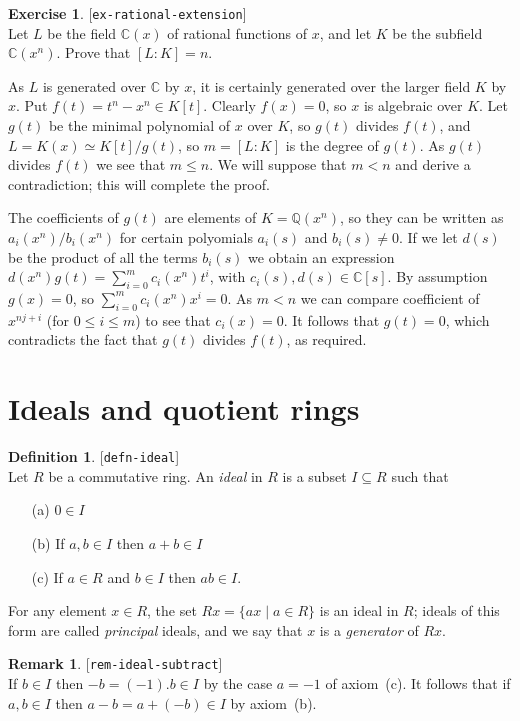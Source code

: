 \documentclass{amsart}
\newcommand{\lbl}[1]{\label{#1}\textup{[\texttt{#1}]}\ \\}
\newcommand{\lbl}{\label}
\newcommand{\Q}         {{\mathbb{Q}}}
\newcommand{\C}         {{\mathbb{C}}}
\newcommand{\st}        {\;|\;}
\newcommand{\sse}       {\subseteq}
\renewcommand{\:}{\colon}
\newcommand{\lastexlabel}{}
\newcommand{\exlabel}[1]{
 \global\def\lastexlabel{#1}\label{#1}[\texttt{#1}]\ \\
}
\newcommand{\exlabel}[1]{
 \global\def\lastexlabel{#1}\label{#1}
}
\newenvironment{solution}{\SolutionInline}{\endSolutionInline}
\theoremstyle{definition}
\newtheorem{remark}[theorem]{Remark}
\newtheorem{definition}[theorem]{Definition}
\newtheorem{exercise}{Exercise}[section]
\renewenvironment{solution}{\SolutionAtEnd}{\endSolutionAtEnd}
\begin{document}
\begin{exercise}\exlabel{ex-rational-extension}
 Let $L$ be the field $\C(x)$ of rational functions of $x$, and let
 $K$ be the subfield $\C(x^n)$.  Prove that $[L:K]=n$.
\end{exercise}
\begin{solution}
 As $L$ is generated over $\C$ by $x$, it is certainly generated over
 the larger field $K$ by $x$.  Put $f(t)=t^n-x^n\in K[t]$.  Clearly
 $f(x)=0$, so $x$ is algebraic over $K$.  Let $g(t)$ be the minimal
 polynomial of $x$ over $K$, so $g(t)$ divides $f(t)$, and
 $L=K(x)\simeq K[t]/g(t)$, so $m=[L:K]$ is the degree of $g(t)$.  As
 $g(t)$ divides $f(t)$ we see that $m\leq n$.  We will suppose that
 $m<n$ and derive a contradiction; this will complete the proof.

 The coefficients of $g(t)$ are elements of $K=\Q(x^n)$, so they can
 be written as $a_i(x^n)/b_i(x^n)$ for certain polyomials $a_i(s)$ and
 $b_i(s)\neq 0$.  If we let $d(s)$ be the product of all the terms
 $b_i(s)$ we obtain an expression
 $d(x^n)g(t)=\sum_{i=0}^mc_i(x^n)t^i$, with $c_i(s),d(s)\in\C[s]$.  By
 assumption $g(x)=0$, so $\sum_{i=0}^mc_i(x^n)x^i=0$.  As $m<n$ we can
 compare coefficient of $x^{nj+i}$ (for $0\leq i\leq m$) to see that
 $c_i(x)=0$.  It follows that $g(t)=0$, which contradicts the fact
 that $g(t)$ divides $f(t)$, as required.
\end{solution}

\section{Ideals and quotient rings}
\label{sec-ideals}

\begin{definition}\lbl{defn-ideal}
 Let $R$ be a commutative ring.  An \emph{ideal} in $R$ is a subset
 $I\sse R$ such that
 \begin{itemize}
  \item[(a)] $0\in I$
  \item[(b)] If $a,b\in I$ then $a+b\in I$
  \item[(c)] If $a\in R$ and $b\in I$ then $ab\in I$.
 \end{itemize}
 For any element $x\in R$, the set $Rx=\{ax\st a\in R\}$ is an ideal
 in $R$; ideals of this form are called \emph{principal} ideals, and
 we say that $x$ is a \emph{generator} of $Rx$.
\end{definition}
\begin{remark}\lbl{rem-ideal-subtract}
 If $b\in I$ then $-b=(-1).b\in I$ by the case $a=-1$ of axiom~(c).
 It follows that if $a,b\in I$ then $a-b=a+(-b)\in I$ by axiom~(b).  
\end{remark}
\end{document}
